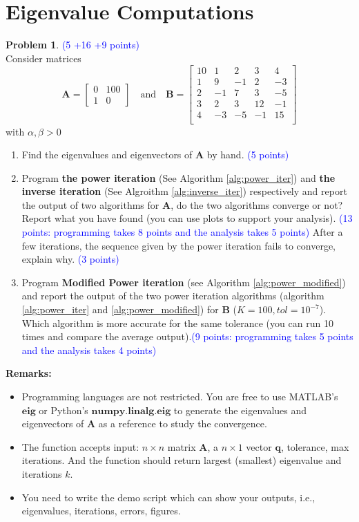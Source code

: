 \documentclass[english,onecolumn]{IEEEtran}
\begin{document}
\section{Eigenvalue Computations}

\noindent\textbf{Problem 1}. \textcolor{blue}{(5 +16 +9 points)}\\
Consider matrices 
$$\mathbf{A}=\begin{bmatrix} 0 & 100 \\ 1 & 0 \end{bmatrix} \quad \text{and}  \quad
\mathbf{B}=\begin{bmatrix} 10 & 1 & 2 & 3 & 4\\ 
                            1 & 9 &-1 & 2 &-3\\           
                            2 &-1 & 7 & 3 &-5\\ 
                            3 & 2 & 3 & 12 &-1\\
                            4 &-3 &-5 &-1 &15\\
\end{bmatrix}$$
with $\alpha,\beta >0$
\begin{enumerate}
    \item Find the eigenvalues and eigenvectors of $\mathbf{A}$ by hand. \textcolor{blue}{(5 points)}
    \item Program \textbf{the power iteration} (See Algorithm \ref{alg:power_iter}) and \textbf{the inverse iteration} (See Algroithm \ref{alg:inverse_iter}) respectively and report the output of two algorithms for $\mathbf{A}$, do the two algorithms converge or not? Report what you have found (you can use plots to support your analysis). \textcolor{blue}{(13 points: programming takes 8 points and the analysis takes 5 points)}
    After a few iterations, the sequence given by the power iteration fails to converge, explain why. \textcolor{blue}{(3 points)}
    \item Program \textbf{Modified Power iteration }(see Algorithm \ref{alg:power_modified}) and report the output of the two power iteration algorithms (algorithm \ref{alg:power_iter} and \ref{alg:power_modified}) for $\mathbf{B}$ ($K = 100, tol =10^{-7}$). Which algorithm is more accurate for the same tolerance (you can run 10 times and compare the average output).\textcolor{blue}{(9 points: programming takes 5 points and the analysis takes 4 points)}
\end{enumerate}
    \textbf{Remarks:}
    \begin{itemize}
        \item Programming languages are not restricted. You are free to use MATLAB's $\textbf{eig}$ or Python's $\textbf{numpy.linalg.eig}$ to generate the eigenvalues and eigenvectors of $\mathbf{A}$ as a reference to study  the convergence.
        \item The function accepts input: $n \times n $ matrix $\mathbf{A}$,  a $n \times 1$ vector $\mathbf{q}$, tolerance, max iterations. And the function should return largest (smallest) eigenvalue and iterations $k$.
        \item You need to write the demo script which can show your outputs, i.e., eigenvalues, iterations, errors, figures.
    \end{itemize}
\end{document}

